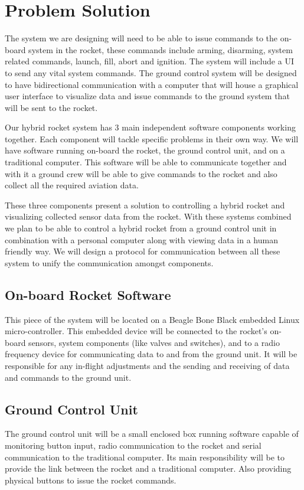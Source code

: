 \documentclass[10pt,draftclsnofoot,onecolumn]{IEEEtran}
\begin{document}
\section{Problem Solution}
The system we are designing will need to be able to issue commands to the on-board system in the rocket, these commands include arming, disarming, system related commands, launch, fill, abort and ignition. The system will include a UI to send any vital system commands. The ground control system will be designed to have bidirectional communication with a computer that will house a graphical user interface to visualize data and issue commands to the ground system that will be sent to the rocket.\par
Our hybrid rocket system has 3 main independent software components working together. Each component will tackle specific problems in their own way. We will have software running on-board the rocket, the ground control unit, and on a traditional computer. This software will be able to communicate together and with it a ground crew will be able to give commands to the rocket and also collect all the required aviation data.\par
These three components present a solution to controlling a hybrid rocket and visualizing collected sensor data from the rocket. With these systems combined we plan to be able to control a hybrid rocket from a ground control unit in combination with a personal computer along with viewing data in a human friendly way. We will design a protocol for communication between all these system to unify the communication amongst components.

\subsection{On-board Rocket Software}
This piece of the system will be located on a Beagle Bone Black embedded Linux micro-controller. This embedded device will be connected to the rocket's on-board sensors, system components (like valves and switches), and to a radio frequency device for communicating data to and from the ground unit. It will be responsible for any in-flight adjustments and the sending and receiving of data and commands to the ground unit.

\subsection{Ground Control Unit}
The ground control unit will be a small enclosed box running software capable of monitoring button input, radio communication to the rocket and serial communication to the traditional computer. Its main responsibility will be to provide the link between the rocket and a traditional computer. Also providing physical buttons to issue the rocket commands. 
\end{document}
